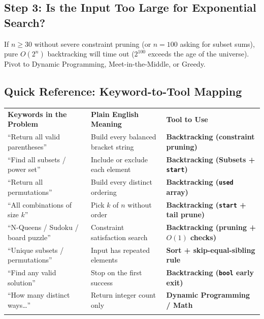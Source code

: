 \documentclass[11pt,a4paper]{article}
\theoremstyle{definition}
\begin{document}
\subsection*{Step 3: Is the Input Too Large for Exponential Search?}
If $n \ge 30$ without severe constraint pruning (or $n = 100$ asking for subset sums), pure $O(2^n)$ backtracking will time out ($2^{100}$ exceeds the age of the universe). Pivot to Dynamic Programming, Meet-in-the-Middle, or Greedy.

\subsection*{Quick Reference: Keyword-to-Tool Mapping}

\begingroup\small{}
\begin{tabularx}{\textwidth}{>{\raggedright\arraybackslash}p{4.3cm} >{\raggedright\arraybackslash}X >{\raggedright\arraybackslash\bfseries}p{4.1cm}}
\arrayrulecolor{primaryblue}\toprule[1.2pt]
\rowcolor{primaryblue!10}
\textcolor{primaryblue}{\textbf{Keywords in the Problem}} & \textcolor{primaryblue}{\textbf{Plain English Meaning}} & \textcolor{primaryblue}{\textbf{Tool to Use}} \\
\arrayrulecolor{codeframe}\midrule[0.6pt]
``Return all valid parentheses'' & Build every balanced bracket string & Backtracking (constraint pruning) \\
``Find all subsets / power set'' & Include or exclude each element & Backtracking (Subsets + \texttt{start}) \\
``Return all permutations'' & Build every distinct ordering & Backtracking (\texttt{used} array) \\
``All combinations of size $k$'' & Pick $k$ of $n$ without order & Backtracking (\texttt{start} + tail prune) \\
``N-Queens / Sudoku / board puzzle'' & Constraint satisfaction search & Backtracking (pruning + $O(1)$ checks) \\
``Unique subsets / permutations'' & Input has repeated elements & Sort + skip-equal-sibling rule \\
``Find any valid solution'' & Stop on the first success & Backtracking (\texttt{bool} early exit) \\
``How many distinct ways\dots'' & Return integer count only & Dynamic Programming / Math \\
\arrayrulecolor{primaryblue}\bottomrule[1.2pt]
\end{tabularx}\endgroup
\end{document}
